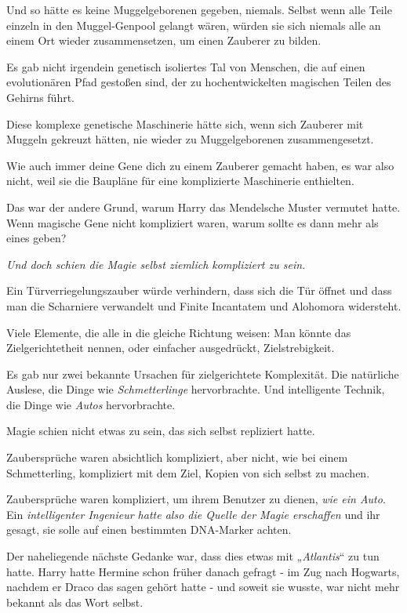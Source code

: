{Und so hätte es keine Muggelgeborenen gegeben, niemals. Selbst wenn alle Teile einzeln in den Muggel-Genpool gelangt wären, würden sie sich niemals alle an einem Ort wieder zusammensetzen, um einen Zauberer zu bilden.

Es gab nicht irgendein genetisch isoliertes Tal von Menschen, die auf einen evolutionären Pfad gestoßen sind, der zu hochentwickelten magischen Teilen des Gehirns führt.

Diese komplexe genetische Maschinerie hätte sich, wenn sich Zauberer mit Muggeln gekreuzt hätten, nie wieder zu Muggelgeborenen zusammengesetzt.

Wie auch immer deine Gene dich zu einem Zauberer gemacht haben, es war also nicht, weil sie die Baupläne für eine komplizierte Maschinerie enthielten.

Das war der andere Grund, warum Harry das Mendelsche Muster vermutet hatte. Wenn magische Gene nicht kompliziert waren, warum sollte es dann mehr als eines geben?

\emph{Und doch schien die Magie selbst ziemlich kompliziert zu sein.}

Ein Türverriegelungszauber würde verhindern, dass sich die Tür öffnet und dass man die Scharniere verwandelt und Finite Incantatem und Alohomora widersteht.

Viele Elemente, die alle in die gleiche Richtung weisen: Man könnte das Zielgerichtetheit nennen, oder einfacher ausgedrückt, Zielstrebigkeit.

Es gab nur zwei bekannte Ursachen für zielgerichtete Komplexität. Die natürliche Auslese, die Dinge wie \emph{Schmetterlinge} hervorbrachte. Und intelligente Technik, die Dinge wie \emph{Autos} hervorbrachte.

Magie schien nicht etwas zu sein, das sich selbst repliziert hatte.

Zaubersprüche waren absichtlich kompliziert, aber nicht, wie bei einem Schmetterling, kompliziert mit dem Ziel, Kopien von sich selbst zu machen.

Zaubersprüche waren kompliziert, um ihrem Benutzer zu dienen, \emph{wie ein Auto}. Ein \emph{intelligenter Ingenieur hatte also die Quelle der Magie erschaffen} und ihr gesagt, sie solle auf einen bestimmten DNA-Marker achten.

Der naheliegende nächste Gedanke war, dass dies etwas mit „\emph{Atlantis}“ zu tun hatte. Harry hatte Hermine schon früher danach gefragt - im Zug nach Hogwarts, nachdem er Draco das sagen gehört hatte - und soweit sie wusste, war nicht mehr bekannt als das Wort selbst.

}
